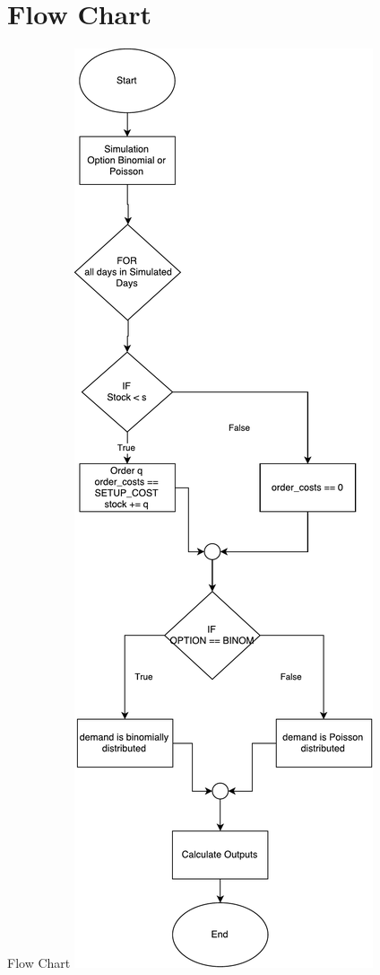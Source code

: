 \section{Flow Chart}
\begin{frame}{Flow Chart}
	\centering
  	\includegraphics[scale=0.15]{BSP21_Flow_Chart.pdf}
\end{frame}

